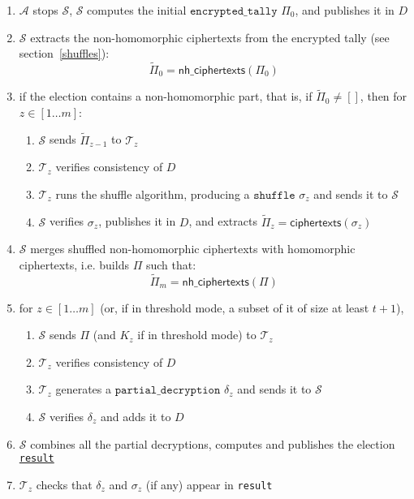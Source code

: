 \documentclass[a4paper]{article}
\newcommand{\etally}{\texttt{encrypted\_tally}}
\newcommand{\pdecryption}{\texttt{partial\_decryption}}
\newcommand{\result}{\texttt{result}}
\begin{document}
\begin{enumerate}
\item $\mathcal{A}$ stops $\mathcal{S}$,  $\mathcal{S}$ computes the initial
  \hyperref[tally]{$\etally$} $\Pi_0$, and publishes it in $D$
\item $\mathcal{S}$ extracts the non-homomorphic ciphertexts from the
  encrypted tally (see
  section~\ref{shuffles}):
  \[\tilde\Pi_0=\textsf{nh\_ciphertexts}(\Pi_0)\]
\item if the election contains a non-homomorphic part, that is, if
  $\tilde\Pi_0\neq []$,
 then for $z\in[1\dots m]$:
  \begin{enumerate}
  \item $\mathcal{S}$ sends $\tilde\Pi_{z-1}$ to $\mathcal{T}_z$
  \item $\mathcal{T}_z$ verifies consistency of $D$
  \item $\mathcal{T}_z$ runs the shuffle algorithm, producing a
    \hyperref[shuffles]{$\texttt{shuffle}$} $\sigma_z$ and sends it to
    $\mathcal{S}$
  \item $\mathcal{S}$ verifies $\sigma_z$, publishes it in $D$, and extracts
    $\tilde\Pi_z=\textsf{ciphertexts}(\sigma_z)$
  \end{enumerate}
\item $\mathcal{S}$ merges shuffled non-homomorphic ciphertexts with
  homomorphic ciphertexts, i.e. builds $\Pi$ such
  that:\[\tilde\Pi_m=\textsf{nh\_ciphertexts}(\Pi)\]
\item for $z\in[1\dots m]$ (or, if in threshold mode, a subset of it
  of size at least $t+1$),
  \begin{enumerate}
  \item $\mathcal{S}$ sends $\Pi$ (and $K_z$ if in threshold mode) to
    $\mathcal{T}_z$
  \item $\mathcal{T}_z$ verifies consistency of $D$
  \item $\mathcal{T}_z$ generates a \hyperref[tally]{$\pdecryption$} $\delta_z$
    and sends it to $\mathcal{S}$
  \item $\mathcal{S}$ verifies $\delta_z$ and adds it to $D$
  \end{enumerate}
\item $\mathcal{S}$ combines all the partial decryptions, computes and publishes
  the election \hyperref[election-result]{\result}
\item $\mathcal{T}_z$ checks that $\delta_z$ and $\sigma_z$ (if any) appear in
  {\result}
\end{enumerate}
\end{document}
